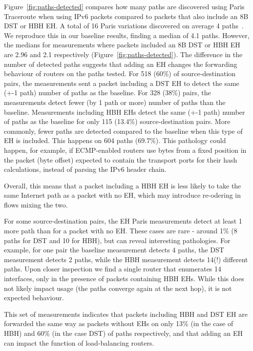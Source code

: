 \documentclass[conference]{IEEEtran}
\begin{document}
Figure~\ref{fig:paths-detected} compares how many paths are discovered using Paris Traceroute when using IPv6 packets compared to packets that also include an 8B DST or HBH EH.
A total of 16 Paris variations discovered on average 4 paths~\cite{augustin2006avoiding}. We reproduce this in our baseline results, finding a median of 4.1 paths. However, the medians for measurements where packets included an 8B DST or HBH EH are 2.96 and 2.1 respectively (Figure~\ref{fig:paths-detected}).
The difference in the number of detected paths suggests that adding an EH changes the forwarding behaviour of routers on the paths tested.
For 518 (60\%) of source-destination pairs, the measurements sent a packet including a DST EH to detect the same (+-1 path) number of paths as the baseline. For 328 (38\%) pairs, the measurements detect fewer (by 1 path or more) number of paths than the baseline. 
Measurements including HBH EHs detect the same (+-1 path) number of paths as the baseline for only 115 (13.4\%) source-destination pairs. More commonly, fewer paths are detected compared to the baseline when this type of EH is included. This happens on 604 paths (69.7\%). This pathology could happen, for example, if ECMP-enabled routers use bytes from a fixed position in the packet (byte offset) expected to contain the transport ports for their hash calculations, instead of parsing the IPv6 header chain. 

Overall, this means that a packet including a HBH EH is less likely to take the same Internet path as a packet with no EH, which may introduce re-odering in flows mixing the two.

For some source-destination pairs, the EH Paris measurements detect at least 1 more path than for a packet with no EH.  These cases are rare - around 1\% (8 paths for DST and 10 for HBH), but can reveal interesting pathologies.
For example, for one pair the baseline measurement detects 4 paths, the DST measurement detects 2 paths, while the HBH measurement detects 14(!) different paths. Upon closer inspection we find a single router that enumerates 14 interfaces, only in the presence of packets containing HBH EHs. While this does not likely impact usage (the paths converge again at the next hop), it is not expected behaviour.

This set of measurements indicates that packets including HBH and DST EH are forwarded the same way as packets without EHs on only 13\% (in the case of HBH) and 60\% (in the case DST) of paths respectively, and that adding an EH can impact the function of load-balancing routers.
 
\end{document}
